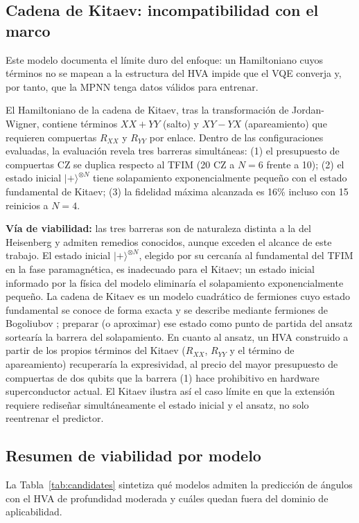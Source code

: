 \documentclass[11pt,a4paper,spanish]{book}
\begin{document}
\subsection{Cadena de Kitaev: incompatibilidad con el marco}

Este modelo documenta el límite duro del enfoque: un Hamiltoniano cuyos términos no se mapean a la estructura del HVA impide que el VQE converja y, por tanto, que la MPNN tenga datos válidos para entrenar.

El Hamiltoniano de la cadena de Kitaev, tras la transformación de Jordan-Wigner, contiene términos $XX + YY$ (salto) y $XY - YX$ (apareamiento) que requieren compuertas $R_{XX}$ y $R_{YY}$ por enlace. Dentro de las configuraciones evaluadas, la evaluación revela tres barreras simultáneas: (1) el presupuesto de compuertas CZ se duplica respecto al TFIM (20 CZ a $N=6$ frente a 10); (2) el estado inicial $|+\rangle^{\otimes N}$ tiene solapamiento exponencialmente pequeño con el estado fundamental de Kitaev; (3) la fidelidad máxima alcanzada es 16\% incluso con 15 reinicios a $N = 4$.

\textbf{Vía de viabilidad:} las tres barreras son de naturaleza distinta a la del Heisenberg y admiten remedios conocidos, aunque exceden el alcance de este trabajo. El estado inicial $|+\rangle^{\otimes N}$, elegido por su cercanía al fundamental del TFIM en la fase paramagnética, es inadecuado para el Kitaev; un estado inicial informado por la física del modelo eliminaría el solapamiento exponencialmente pequeño. La cadena de Kitaev es un modelo cuadrático de fermiones cuyo estado fundamental se conoce de forma exacta y se describe mediante fermiones de Bogoliubov \citep{kitaev2001}; preparar (o aproximar) ese estado como punto de partida del ansatz sortearía la barrera del solapamiento. En cuanto al ansatz, un HVA construido a partir de los propios términos del Kitaev ($R_{XX}$, $R_{YY}$ y el término de apareamiento) recuperaría la expresividad, al precio del mayor presupuesto de compuertas de dos qubits que la barrera (1) hace prohibitivo en hardware superconductor actual. El Kitaev ilustra así el caso límite en que la extensión requiere rediseñar simultáneamente el estado inicial y el ansatz, no solo reentrenar el predictor.

\subsection{Resumen de viabilidad por modelo}

La Tabla~\ref{tab:candidates} sintetiza qué modelos admiten la predicción de ángulos con el HVA de profundidad moderada y cuáles quedan fuera del dominio de aplicabilidad.
\end{document}
